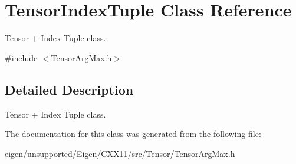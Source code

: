 \hypertarget{class_tensor_index_tuple}{}\section{Tensor\+Index\+Tuple Class Reference}
\label{class_tensor_index_tuple}


Tensor + Index Tuple class.  




{\ttfamily \#include $<$Tensor\+Arg\+Max.\+h$>$}



\subsection{Detailed Description}
Tensor + Index Tuple class. 

The documentation for this class was generated from the following file\+:\begin{DoxyCompactItemize}
\item 
eigen/unsupported/\+Eigen/\+C\+X\+X11/src/\+Tensor/\+Tensor\+Arg\+Max.\+h\end{DoxyCompactItemize}
